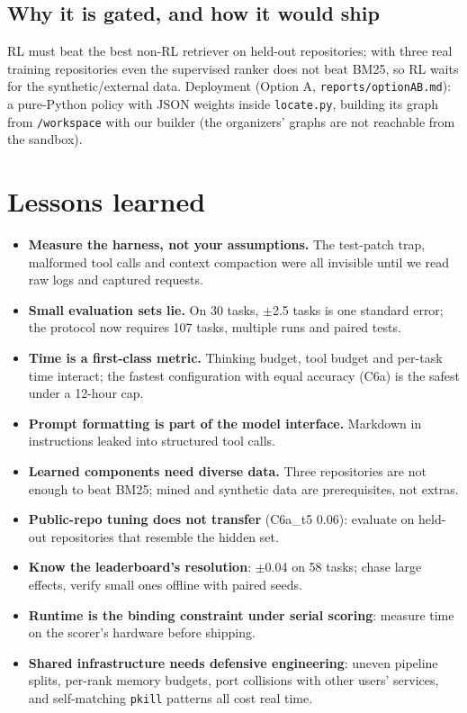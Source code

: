 \documentclass[10pt,a4paper]{article}
\newcommand{\code}[1]{\texttt{#1}}
\newcommand{\1}{\mathbb{1}}
\begin{document}
\subsection{Why it is gated, and how it would ship}
RL must beat the best non-RL retriever on held-out repositories; with three real training repositories even the
supervised ranker does not beat BM25, so RL waits for the synthetic/external data. Deployment (Option A,
\code{reports/optionAB.md}): a pure-Python policy with JSON weights inside \code{locate.py}, building its graph from
\code{/workspace} with our builder (the organizers' graphs are not reachable from the sandbox).



\section{Lessons learned}
\begin{itemize}
\item \textbf{Measure the harness, not your assumptions.} The test-patch trap, malformed tool calls and context compaction were all invisible until we read raw logs and captured requests.
\item \textbf{Small evaluation sets lie.} On 30 tasks, $\pm$2.5 tasks is one standard error; the protocol now requires 107 tasks, multiple runs and paired tests.
\item \textbf{Time is a first-class metric.} Thinking budget, tool budget and per-task time interact; the fastest configuration with equal accuracy (C6a) is the safest under a 12-hour cap.
\item \textbf{Prompt formatting is part of the model interface.} Markdown in instructions leaked into structured tool calls.
\item \textbf{Learned components need diverse data.} Three repositories are not enough to beat BM25; mined and synthetic data are prerequisites, not extras.
\item \textbf{Public-repo tuning does not transfer} (C6a\_t5 0.06): evaluate on held-out repositories that resemble the hidden set.
\item \textbf{Know the leaderboard's resolution}: $\pm$0.04 on 58 tasks; chase large effects, verify small ones offline with paired seeds.
\item \textbf{Runtime is the binding constraint under serial scoring}: measure time on the scorer's hardware before shipping.
\item \textbf{Shared infrastructure needs defensive engineering}: uneven pipeline splits, per-rank memory budgets, port collisions with other users' services, and self-matching \code{pkill} patterns all cost real time.
\end{itemize}
\end{document}
